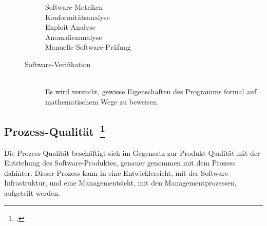 \begin{description}
\begin{description}
\begin{description}
      \item[Software-Metriken] \hfill 
      \item[Konformitätsanalyse] \hfill 
      \item[Exploit-Analyse] \hfill 
      \item[Anomalienanalyse] \hfill 
      \item[Manuelle Software-Prüfung] \hfill 
    \end{description}
    \item[Software-Verifikation] \hfill \\ Es wird versucht, gewisse Eigenschaften des Programms formal auf mathematischem Wege zu beweisen.
  \end{description}
\end{description}

\clearpage
\subsection[Prozess-Qualität]{Prozess-Qualität~\footcite[vgl.][Kapitel 1.4.2]{hoffmann_software_qualitat_2013}}

Die Prozess-Qualität beschäftigt sich im Gegensatz zur Produkt-Qualität mit der Entstehung des Software-Produktes, genauer genommen mit dem Prozess dahinter.
Dieser Prozess kann in eine Entwicklersicht, mit der Software-Infrastruktur, und eine Managementsicht, mit den Managementprozessen, aufgeteilt werden.

